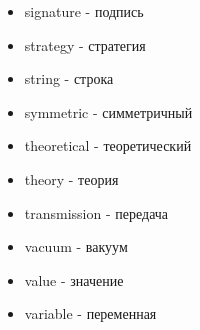 \begin{multicols}{2}
\begin{itemize}
\item signature - подпись

\item strategy - стратегия

\item string - строка

\item symmetric - симметричный

\item theoretical - теоретический
\item theory - теория

\item transmission - передача

\item vacuum - вакуум
\item value - значение

\item variable - переменная



\end{itemize}
\end{multicols}